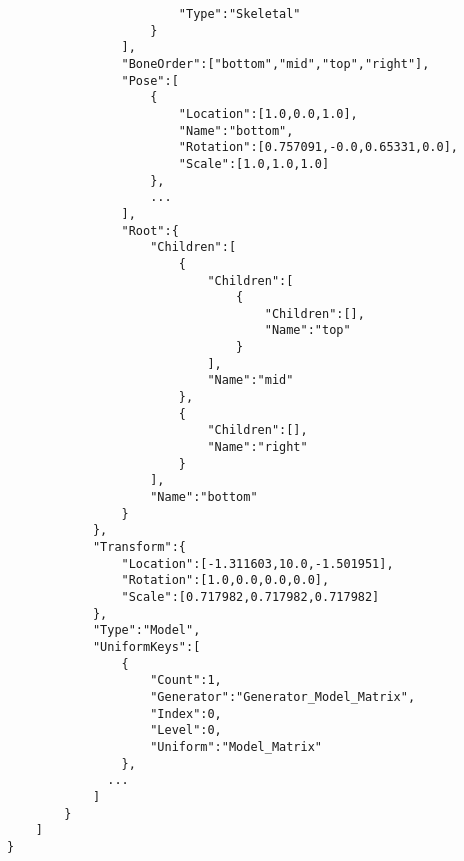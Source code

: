 \begin{verbatim}
                        "Type":"Skeletal"
                    }
                ],
                "BoneOrder":["bottom","mid","top","right"],
                "Pose":[
                    {
                        "Location":[1.0,0.0,1.0],
                        "Name":"bottom",
                        "Rotation":[0.757091,-0.0,0.65331,0.0],
                        "Scale":[1.0,1.0,1.0]
                    },
					...
                ],
                "Root":{
                    "Children":[
                        {
                            "Children":[
                                {
                                    "Children":[],
                                    "Name":"top"
                                }
                            ],
                            "Name":"mid"
                        },
                        {
                            "Children":[],
                            "Name":"right"
                        }
                    ],
                    "Name":"bottom"
                }
            },
            "Transform":{
                "Location":[-1.311603,10.0,-1.501951],
                "Rotation":[1.0,0.0,0.0,0.0],
                "Scale":[0.717982,0.717982,0.717982]
            },
            "Type":"Model",
            "UniformKeys":[
                {
                    "Count":1,
                    "Generator":"Generator_Model_Matrix",
                    "Index":0,
                    "Level":0,
                    "Uniform":"Model_Matrix"
                },
              ...
            ]
        }
    ]
}
\end{verbatim}